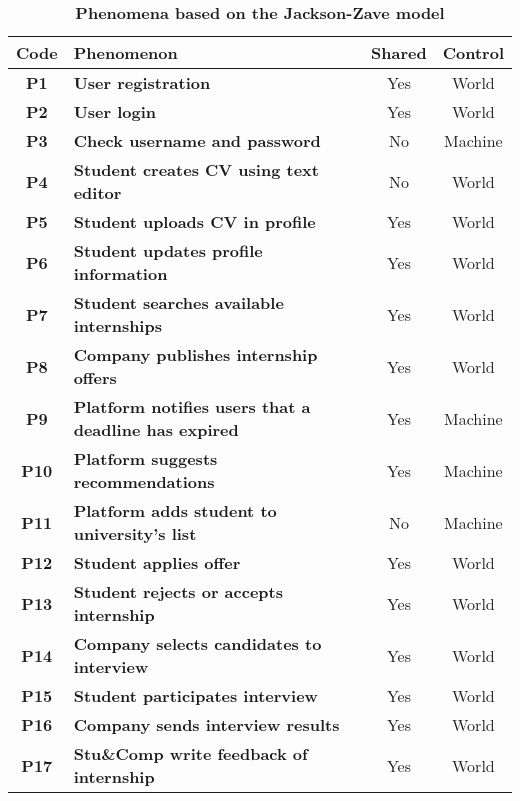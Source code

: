 \begin{table}[H]
    \caption*{\textbf{Phenomena based on the Jackson-Zave model}}
    \centering 
    \begin{tabular}{|c|p{24em}|c|c|}
    \hline
    \rowcolor{bluepoli!40} %
    \small\textbf{Code} & \small\textbf{Phenomenon} & \small\textbf{Shared} & \small\textbf{Control} \T\B \\
    \hline
    \small\textbf{P1} &\small \textbf{User registration} & Yes & World \T\B \\
    \small\textbf{P2} &\small \textbf{User login} & Yes & World \T\B\\
    \small\textbf{P3} &\small \textbf{Check username and password} & No & Machine \T\B\\
    \small\textbf{P4} &\small \textbf{Student creates CV using text editor} & No & World  \T\B \\
    \small\textbf{P5} &\small \textbf{Student uploads CV in profile} & Yes & World  \T\B \\
    \small\textbf{P6} &\small \textbf{Student updates profile information} & Yes & World  \T\B \\
    \small\textbf{P7} &\small \textbf{Student searches available internships} & Yes & World \T\B\\
    \small\textbf{P8} &\small \textbf{Company publishes internship offers} & Yes & World \T\B \\
    \small\textbf{P9} &\small \textbf{Platform notifies users that a deadline has expired} & Yes & Machine \B\\
    \small\textbf{P10} &\small \textbf{Platform suggests recommendations} & Yes & Machine \T\B \\
    \small\textbf{P11} &\small \textbf{Platform adds student to university's list} & No & Machine \T\B \\
    \small\textbf{P12} &\small \textbf{Student applies offer} & Yes & World \B\\
    \small\textbf{P13} &\small \textbf{Student rejects or accepts internship} & Yes & World \T\B \\
    \small\textbf{P14} &\small \textbf{Company selects candidates to interview} & Yes & World \T\B\\
    \small\textbf{P15} &\small \textbf{Student participates interview} & Yes & World \T\B \\
    \small\textbf{P16} &\small \textbf{Company sends interview results} & Yes & World \B\\
    \small\textbf{P17} &\small \textbf{Stu\&Comp write feedback of internship} & Yes & World \T\B\\

\end{tabular}
\end{table}
